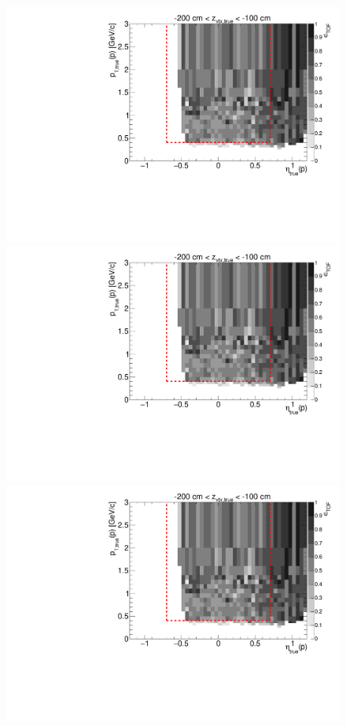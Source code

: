 \begin{figure}[hb]
{  \includegraphics[width=\linewidth,page=6]{graphics/eff/Eff2D_TOF_proton_Minus.pdf}\\
  \includegraphics[width=\linewidth,page=8]{graphics/eff/Eff2D_TOF_proton_Minus.pdf}\\
  \includegraphics[width=\linewidth,page=10]{graphics/eff/Eff2D_TOF_proton_Minus.pdf}
}%
\end{figure}
